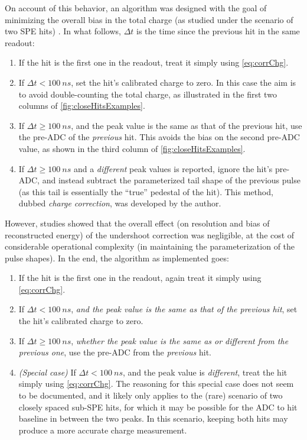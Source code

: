 \documentclass[../thesis.tex]{subfiles}
\begin{document}
On account of this behavior, an algorithm was designed with the goal of minimizing the overall bias in the total charge (as studied under the scenario of two SPE hits) \cite{closeHits}. In what follows, $\Delta t$ is the time since the previous hit in the same readout:

\begin{enumerate}
\item If the hit is the first one in the readout, treat it simply using \autoref{eq:corrChg}.
\item If $\Delta t < \SI{100}{ns}$, set the hit's calibrated charge to zero. In this case the aim is to avoid double-counting the total charge, as illustrated in the first two columns of \autoref{fig:closeHitsExamples}.
\item If $\Delta t \ge \SI{100}{ns}$, and the peak value is the same as that of the previous hit, use the pre-ADC of the \emph{previous} hit. This avoids the bias on the second pre-ADC value, as shown in the third column of \autoref{fig:closeHitsExamples}.
\item If $\Delta t \ge \SI{100}{ns}$ and a \emph{different} peak values is reported, ignore the hit's pre-ADC, and instead subtract the parameterized tail shape of the previous pulse (as this tail is essentially the ``true'' pedestal of the hit). This method, dubbed \emph{charge correction}, was developed by the author.
\end{enumerate}

However, studies showed that the overall effect (on resolution and bias of reconstructed energy) of the undershoot correction was negligible, at the cost of considerable operational complexity (in maintaining the parameterization of the pulse shapes). In the end, the algorithm as implemented goes:

\begin{enumerate}
\item If the hit is the first one in the readout, again treat it simply using \autoref{eq:corrChg}.
\item If $\Delta t < \SI{100}{ns}$, \emph{and the peak value is the same as that of the previous hit}, set the hit's calibrated charge to zero.
\item If $\Delta t \ge \SI{100}{ns}$, \emph{whether the peak value is the same as or different from the previous one}, use the pre-ADC from the \emph{previous} hit.
\item \emph{(Special case)} If $\Delta t < \SI{100}{ns}$, and the peak value is \emph{different}, treat the hit simply using \autoref{eq:corrChg}. The reasoning for this special case does not seem to be documented, and it likely only applies to the (rare) scenario of two closely spaced sub-SPE hits, for which it may be possible for the ADC to hit baseline in between the two peaks. In this scenario, keeping both hits may produce a more accurate charge measurement.
\end{enumerate}
\end{document}
